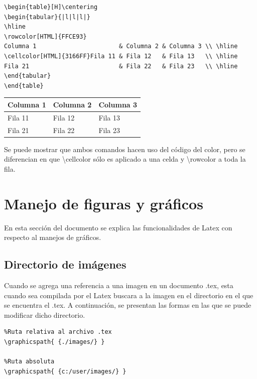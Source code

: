 \documentclass[letterpaper, 10pt, journal]{IEEEtran}
\begin{document}
\lstset{language=Java}
\begin{lstlisting}
\begin{table}[H]\centering
\begin{tabular}{|l|l|l|}
\hline
\rowcolor[HTML]{FFCE93} 
Columna 1                       & Columna 2 & Columna 3 \\ \hline
\cellcolor[HTML]{3166FF}Fila 11 & Fila 12   & Fila 13   \\ \hline
Fila 21                         & Fila 22   & Fila 23   \\ \hline
\end{tabular}
\end{table}
\end{lstlisting}

\begin{table}[H]\centering
\begin{tabular}{|l|l|l|}
\hline
\rowcolor[HTML]{FFCE93} 
Columna 1                       & Columna 2 & Columna 3 \\ \hline
\cellcolor[HTML]{3166FF}Fila 11 & Fila 12   & Fila 13   \\ \hline
Fila 21                         & Fila 22   & Fila 23   \\ \hline
\end{tabular}
\end{table}

Se puede mostrar que ambos comandos hacen uso del c\'{o}digo del color, pero se diferencian en que \textbackslash{}cellcolor s\'{o}lo es aplicado a una celda y \textbackslash{}rowcolor a toda la fila.

\section{Manejo de figuras y gr\'aficos}
En esta secci\'{o}n del documento se explica las funcionalidades de Latex con respecto al manejos de gr\'{a}ficos.

\subsection{Directorio de im\'agenes}
Cuando se agrega una referencia a una imagen en un documento .tex, esta cuando sea compilada por el Latex buscara a la imagen en el directorio en el que se encuentra el .tex. A continuaci\'{o}n, se presentan las formas en las que se puede modificar dicho directorio.

\lstset{language=Java}
\begin{lstlisting}
%Ruta relativa al archivo .tex 
\graphicspath{ {./images/} }

%Ruta absoluta
\graphicspath{ {c:/user/images/} }
\end{lstlisting}
\end{document}
